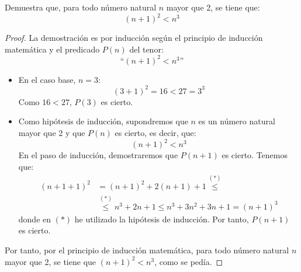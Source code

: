 \begin{ejercicio}\label{ej:SigCuadradoMenorCubo}
    Demuestra que, para todo número natural $n$ mayor que 2, se tiene que:
    $$(n+1)^2 < n^3$$
    
    \begin{proof}
        La demostración es por inducción según el principio de inducción matemática y el predicado $P(n)$ del tenor:
        \begin{equation*}
            \text{``}(n+1)^2 < n^3\text{''}
        \end{equation*}
        \begin{itemize}
            \item En el caso base, $n=3$:
                \begin{equation*}
                    (3+1)^2 = 16 < 27 = 3^3
                \end{equation*}
                Como $16 < 27$, $P(3)$ es cierto.

            \item Como hipótesis de inducción, supondremos que $n$ es un número natural mayor que 2 y que $P(n)$ es cierto, es decir, que:
                \begin{equation*}
                    (n+1)^2 < n^3
                \end{equation*}
                En el paso de inducción, demostraremos que $P(n+1)$ es cierto. Tenemos que:
                \begin{align*}
                    (n+1+1)^2 &= (n+1)^2 + 2(n+1) + 1 \stackrel{(\ast)}{\leq} \\ &\stackrel{(\ast)}{\leq}
                    n^3 + 2n + 1 \leq n^3 +3n^2 + 3n + 1 = (n+1)^3
                \end{align*}
                donde en $(\ast)$ he utilizado la hipótesis de inducción. Por tanto, $P(n+1)$ es cierto.
        \end{itemize}
        Por tanto, por el principio de inducción matemática, para todo número natural $n$ mayor que 2, se tiene que $(n+1)^2 < n^3$, como se pedía.
    \end{proof}
\end{ejercicio}

